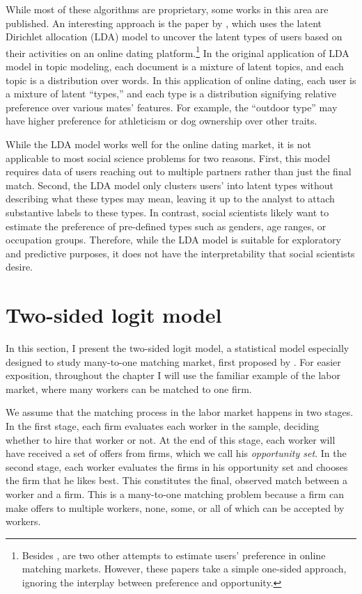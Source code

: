 While most of these algorithms are proprietary, some works in this area are
published. An interesting approach is the paper by \citet{Tu2014}, which uses
the latent Dirichlet allocation (LDA) model to uncover the latent types of users
based on their activities on an online dating platform.\footnote{Besides
  \citet{Tu2014}, \citet{Hitsch2010, Goswami2014} are two other attempts to
  estimate users' preference in online matching markets. However, these papers
  take a simple one-sided approach, ignoring the interplay between preference
  and opportunity.} In the original application of LDA model in topic modeling,
each document is a mixture of latent topics, and each topic is a distribution
over words. In this application of online dating, each user is a mixture of
latent ``types,'' and each type is a distribution signifying relative preference
over various mates' features. For example, the ``outdoor type'' may have higher
preference for athleticism or dog ownership over other traits.

While the LDA model works well for the online dating market, it is not
applicable to most social science problems for two reasons. First, this model
requires data of users reaching out to multiple partners rather than just the
final match. Second, the LDA model only clusters users' into latent types
without describing what these types may mean, leaving it up to the analyst to
attach substantive labels to these types. In contrast, social scientists likely
want to estimate the preference of pre-defined types such as genders, age
ranges, or occupation groups. Therefore, while the LDA model is suitable for
exploratory and predictive purposes, it does not have the interpretability that
social scientists desire.

\section{Two-sided logit model}

In this section, I present the two-sided logit model, a statistical model
especially designed to study many-to-one matching market, first proposed by
\cite{Logan1996}. For easier exposition, throughout the chapter I will use the
familiar example of the labor market, where many workers can be matched to one
firm.

We assume that the matching process in the labor market happens in two stages.
In the first stage, each firm evaluates each worker in the sample, deciding
whether to hire that worker or not. At the end of this stage, each worker will
have received a set of offers from firms, which we call his \textit{opportunity
  set}. In the second stage, each worker evaluates the firms in his opportunity
set and chooses the firm that he likes best. This constitutes the final,
observed match between a worker and a firm. This is a many-to-one matching
problem because a firm can make offers to multiple workers, none, some, or all
of which can be accepted by workers.

